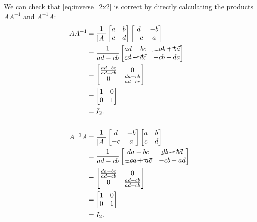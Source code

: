 We can check that \autoref{eq:inverse_2x2} is correct by directly calculating the products $AA^{-1}$ and $A^{-1}A$:
\begin{align*}
	AA^{-1} &= \frac{1}{|A|}\begin{bmatrix}a&b\\c&d\end{bmatrix}\begin{bmatrix}d&-b\\-c&a\end{bmatrix}\\
			&= \frac{1}{ad-cb}\begin{bmatrix} ad-bc & \cancel{-ab+ba} \\ \cancel{cd-dc} & -cb+da \end{bmatrix}\\
			&= \begin{bmatrix}\frac{ad-bc}{ad-cb} & 0 \\ 0 & \frac{da-cb}{ad-bc}\end{bmatrix}\\
			&= \begin{bmatrix} 1&0 \\ 0&1 \end{bmatrix}\\
			&= I_{2}.\\
			\\
	A^{-1}A &= \frac{1}{|A|}\begin{bmatrix}d&-b\\-c&a\end{bmatrix}\begin{bmatrix}a&b\\c&d\end{bmatrix}\\
			&= \frac{1}{ad-cb}\begin{bmatrix} da-bc & \cancel{db-bd} \\ \cancel{-ca+ac} & -cb+ad \end{bmatrix}\\
			&= \begin{bmatrix} \frac{da-bc}{ad-cb} & 0 \\ 0 & \frac{ad-cb}{ad-cb} \end{bmatrix}\\
			&= \begin{bmatrix} 1&0 \\ 0&1 \end{bmatrix}\\
			&= I_{2}.
\end{align*}

